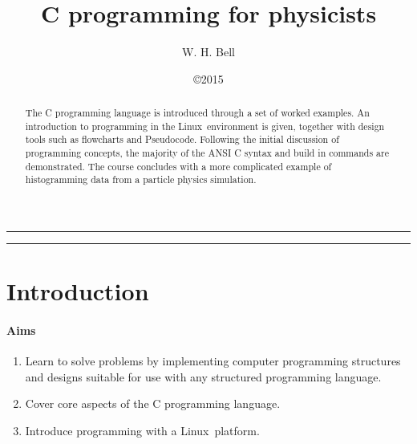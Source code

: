 \documentclass[11pt]{scrartcl}
\def\psc{Pseudocode}
\def\linux{Linux}
\begin{document}
\title{C programming for physicists}
\author{W. H. Bell}
\date{
\copyright 2015
}

\maketitle
\hrule
\vspace{0.2cm}
\begin{abstract}
The C programming language is introduced through a set of worked examples.  An introduction to programming in the \linux\ environment is given, together with design tools such as flowcharts and \psc.  Following the initial discussion of programming concepts, the majority of the ANSI C syntax and build in commands are demonstrated.  The course concludes with a more complicated example of histogramming data from a particle physics simulation.
\end{abstract}
\vspace{0.2cm}
\hrule

\clearpage
\newpage

\tableofcontents

\clearpage
\newpage

\pagestyle{fancy}

\section{Introduction}
\paragraph{Aims}
\begin{enumerate}
\item Learn to solve problems by implementing computer programming structures and designs suitable for use with any structured programming language.
\item Cover core aspects of the C programming language.
\item Introduce programming with a \linux\ platform. 
\end{enumerate}
\end{document}
